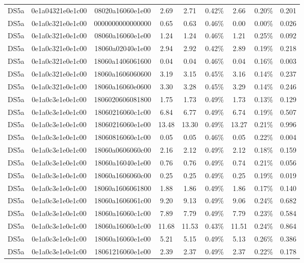 \begin{tabular}{|c|c c|c|c c|c c|c|}
  DS5a & 0e1a04321e0e1c00 & 08020a16060e1e00 & 2.69 & 2.71 & 0.42\% & 2.66 & 0.20\% & 0.201 \\
  DS5a & 0e1a0c321e0e1c00 & 0000000000000000 & 0.65 & 0.63 & 0.46\% & 0.00 & 0.00\% & 0.026 \\
  DS5a & 0e1a0c321e0e1c00 & 08060a16060e1e00 & 1.24 & 1.24 & 0.46\% & 1.21 & 0.25\% & 0.092 \\
  DS5a & 0e1a0c321e0e1c00 & 18060a02040e1e00 & 2.94 & 2.92 & 0.42\% & 2.89 & 0.19\% & 0.218 \\
  DS5a & 0e1a0c321e0e1c00 & 18060a1406061600 & 0.04 & 0.04 & 0.46\% & 0.04 & 0.16\% & 0.003 \\
  DS5a & 0e1a0c321e0e1c00 & 18060a1606060600 & 3.19 & 3.15 & 0.45\% & 3.16 & 0.14\% & 0.237 \\
  DS5a & 0e1a0c321e0e1c00 & 18060a16060e0600 & 3.30 & 3.28 & 0.45\% & 3.29 & 0.14\% & 0.246 \\
  DS5a & 0e1a0c3e1e0e1c00 & 1806020606081800 & 1.75 & 1.73 & 0.49\% & 1.73 & 0.13\% & 0.129 \\
  DS5a & 0e1a0c3e1e0e1c00 & 18060216060c1c00 & 6.84 & 6.77 & 0.49\% & 6.74 & 0.19\% & 0.507 \\
  DS5a & 0e1a0c3e1e0e1c00 & 18060216060e1e00 & 13.48 & 13.30 & 0.49\% & 13.27 & 0.21\% & 0.996 \\
  DS5a & 0e1a0c3e1e0e1c00 & 18060816060e1c00 & 0.05 & 0.05 & 0.46\% & 0.05 & 0.22\% & 0.004 \\
  DS5a & 0e1a0c3e1e0e1c00 & 18060a0606060c00 & 2.16 & 2.12 & 0.49\% & 2.12 & 0.18\% & 0.159 \\
  DS5a & 0e1a0c3e1e0e1c00 & 18060a16040e1e00 & 0.76 & 0.76 & 0.49\% & 0.74 & 0.21\% & 0.056 \\
  DS5a & 0e1a0c3e1e0e1c00 & 18060a1606060c00 & 0.25 & 0.25 & 0.49\% & 0.25 & 0.19\% & 0.019 \\
  DS5a & 0e1a0c3e1e0e1c00 & 18060a1606061800 & 1.88 & 1.86 & 0.49\% & 1.86 & 0.17\% & 0.140 \\
  DS5a & 0e1a0c3e1e0e1c00 & 18060a1606061c00 & 9.20 & 9.13 & 0.49\% & 9.06 & 0.24\% & 0.682 \\
  DS5a & 0e1a0c3e1e0e1c00 & 18060a16060c1c00 & 7.89 & 7.79 & 0.49\% & 7.79 & 0.23\% & 0.584 \\
  DS5a & 0e1a0c3e1e0e1c00 & 18060a16060e1c00 & 11.68 & 11.53 & 0.43\% & 11.51 & 0.24\% & 0.864 \\
  DS5a & 0e1a0c3e1e0e1c00 & 18060a16060e1e00 & 5.21 & 5.15 & 0.49\% & 5.13 & 0.26\% & 0.386 \\
  DS5a & 0e1a0c3e1e0e1c00 & 18061216060e1e00 & 2.39 & 2.37 & 0.49\% & 2.37 & 0.22\% & 0.178 \\

\end{tabular}
